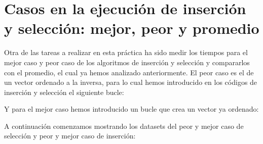 \documentclass[10pt,a4paper]{article}
\begin{document}
\section{Casos en la ejecución de inserción y selección: mejor, peor y promedio}

Otra de las tareas a realizar en esta práctica ha sido medir los tiempos para el mejor caso y peor caso de los algoritmos de inserción y selección y compararlos con el promedio, el cual ya hemos analizado anteriormente. El peor caso es el de un vector ordenado a la inversa, para lo cual hemos introducido en los códigos de inserción y selección el siguiente bucle:



Y para el mejor caso hemos introducido un bucle que crea un vector ya ordenado:



A continuación comenzamos mostrando los datasets del peor y mejor caso de selección y peor y mejor caso de inserción:

\begin{table}[h!]
	\centering
	\footnotesize
	\hspace{2cm}
	\hspace{2cm}
	\caption{Datasets de la ejecución del peor caso para Selección}
\end{table}
\end{document}
